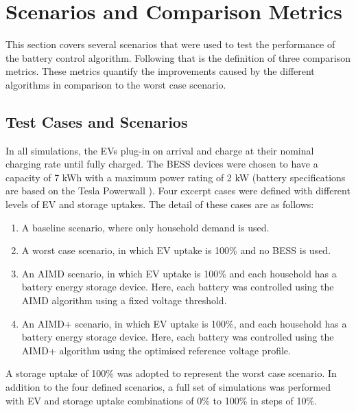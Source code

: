 \section{Scenarios and Comparison Metrics}
\label{ch4:sec:scenarios-and-comparison-metrics}

This section covers several scenarios that were used to test the performance of the battery control algorithm.
Following that is the definition of three comparison metrics.
These metrics quantify the improvements caused by the different algorithms in comparison to the worst case scenario.

\subsection{Test Cases and Scenarios}
\label{ch4:subsec:test-cases-and-scenarios}

In all simulations, the EVs plug-in on arrival and charge at their nominal charging rate until fully charged. The BESS devices were chosen to have a capacity of 7 kWh with a maximum power rating of 2 kW (battery specifications are based on the Tesla Powerwall \cite{Powerwall2015}).
Four excerpt cases were defined with different levels of EV and storage uptakes.
The detail of these cases are as follows:

\begin{enumerate}[
labelindent=*,
style=multiline,
leftmargin=*,
label=\textbf{Case \Alph*}
]
\item \label{ch4:case-a}
A baseline scenario, where only household demand is used.
\item \label{ch4:case-b}
A worst case scenario, in which EV uptake is 100\% and no BESS is used.
\item \label{ch4:case-c}
An AIMD scenario, in which EV uptake is 100\% and each household has a battery energy storage device.
Here, each battery was controlled using the AIMD algorithm using a fixed voltage threshold.
\item \label{ch4:case-d}
An AIMD+ scenario, in which EV uptake is 100\%, and each household has a battery energy storage device.
Here, each battery was controlled using the AIMD+ algorithm using the optimised reference voltage profile.
\end{enumerate}

A storage uptake of 100\% was adopted to represent the worst case scenario.
In addition to the four defined scenarios, a full set of simulations was performed with EV and storage uptake combinations of 0\% to 100\% in steps of 10\%.

